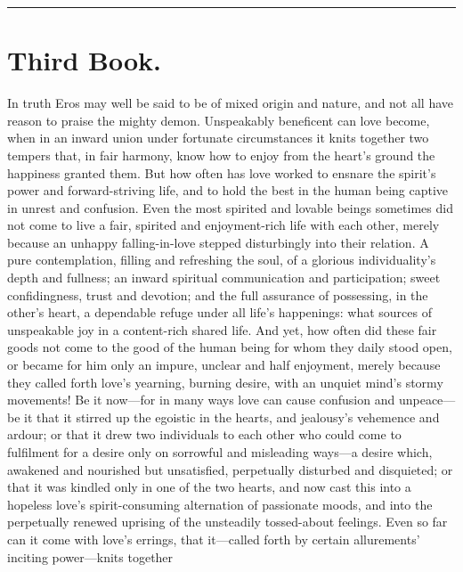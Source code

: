 \documentclass[12pt,a4paper]{book}
\begin{document}
\begin{center}\rule{0.28\linewidth}{0.4pt}\end{center}

\chapter*{Third Book.}

In truth Eros may well be said to be of mixed origin and nature, and not
all have reason to praise the mighty demon. Unspeakably beneficent can love
become, when in an inward union under fortunate circumstances it knits
together two tempers that, in fair harmony, know how to enjoy from the
heart's ground the happiness granted them. But how often has love worked to
ensnare the spirit's power and forward-striving life, and to hold the best
in the human being captive in unrest and confusion. Even the most spirited
and lovable beings sometimes did not come to live a fair, spirited and
enjoyment-rich life with each other, merely because an unhappy
falling-in-love stepped disturbingly into their relation. A pure
contemplation, filling and refreshing the soul, of a glorious
individuality's depth and fullness; an inward spiritual communication and
participation; sweet confidingness, trust and devotion; and the full
assurance of possessing, in the other's heart, a dependable refuge under
all life's happenings: what sources of unspeakable joy in a content-rich
shared life. And yet, how often did these fair goods not come to the good
of the human being for whom they daily stood open, or became for him only
an impure, unclear and half enjoyment, merely because they called forth
love's yearning, burning desire, with an unquiet mind's stormy movements!
Be it now---for in many ways love can cause confusion and unpeace---be it
that it stirred up the egoistic in the hearts, and jealousy's vehemence and
ardour; or that it drew two individuals to each other who could come to
fulfilment for a desire only on sorrowful and misleading ways---a desire
which, awakened and nourished but unsatisfied, perpetually disturbed and
disquieted; or that it was kindled only in one of the two hearts, and now
cast this into a hopeless love's spirit-consuming alternation of passionate
moods, and into the perpetually renewed uprising of the unsteadily
tossed-about feelings. Even so far can it come with love's errings, that
it---called forth by certain allurements' inciting power---knits together
\end{document}
